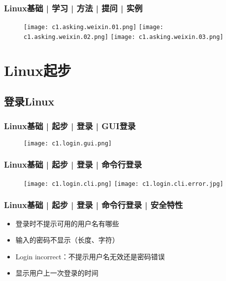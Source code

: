 \begin{frame}
  \frametitle{Linux基础 | 学习 | 方法 | 提问 | 实例}
  \begin{figure}
    \centering
    \texttt{[image: c1.asking.weixin.01.png]}
    \texttt{[image: c1.asking.weixin.02.png]}
    \texttt{[image: c1.asking.weixin.03.png]}
  \end{figure}
\end{frame}

\section{Linux起步}
\subsection{登录Linux}
\begin{frame}
  \frametitle{Linux基础 | 起步 | 登录 | GUI登录}
  \begin{figure}
    \centering
    \texttt{[image: c1.login.gui.png]}
  \end{figure}
\end{frame}

\begin{frame}
  \frametitle{Linux基础 | 起步 | 登录 | 命令行登录}
  \begin{figure}
    \centering
    \texttt{[image: c1.login.cli.png]}
    \vspace{0.1cm}
    \texttt{[image: c1.login.cli.error.jpg]}
  \end{figure}
\end{frame}

\begin{frame}
  \frametitle{Linux基础 | 起步 | 登录 | 命令行登录 | 安全特性}
  \begin{itemize}[<+->]
    \item 登录时不提示可用的用户名有哪些
    \item 输入的密码不显示（长度、字符）
    \item Login incorrect：不提示用户名无效还是密码错误
    \item 显示用户上一次登录的时间
  \end{itemize}
\end{frame}

